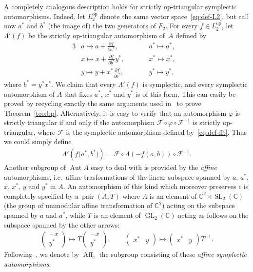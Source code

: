 \documentclass[11pt]{article}
\newcommand{\bb}[1]{\mathbb{#1}}
\DeclareMathOperator{\GL}{GL}
\DeclareMathOperator{\SL}{SL}
\DeclareMathOperator{\Aut}{Aut}
\DeclareMathOperator{\Aff}{Aff}
\begin{document}
A completely analogous description holds for strictly op-triangular symplectic automorphisms.
Indeed, let \(L_{2}^{\mathrm{op}}\) denote the same vector space~\eqref{eq:def-L2}, but call now \(a^{*}\)
and \(b^{*}\) (the image of) the two generators of \(F_{2}\).
For every \(f\in L_{2}^{\mathrm{op}}\), let \(\Lambda'(f)\) be the strictly op-triangular automorphism of~\(A\) def\/ined by
\begin{alignat*}{3}
& a\mapsto a+\frac{\partial f}{\partial a^{*}}, \qquad && a^{*}\mapsto a^{*}, & \\
& x\mapsto x+\frac{\partial f}{\partial b^{*}}y^{*}, \qquad && x^{*}\mapsto x^{*}, & \\
& y\mapsto y+x^{*}\frac{\partial f}{\partial b^{*}}, \qquad && y^{*}\mapsto y^{*}, &
\end{alignat*}
where \(b^{*} = y^{*}x^{*}\).
We claim that every \(\Lambda'(f)\) is symplectic, and every symplectic automorphism of \(A\) that f\/ixes
\(a^{*}\), \(x^{*}\) and \(y^{*}\) is of this form.
This can easily be proved by recycling exactly the same arguments used in~\cite{bp08} to prove
Theorem~\ref{teo:bp}.
Alternatively, it is easy to verify that an automorphism \(\varphi\) is strictly triangular if and only if
the automorphism \(\mathcal{F}\circ \varphi\circ \mathcal{F}^{-1}\) is strictly op-triangular, where
\(\mathcal{F}\) is the symplectic automorphism def\/ined by~\eqref{eq:def-fft}.
Thus we could simply def\/ine
\begin{gather}
\label{eq:t-opt}
\Lambda'(f\big(a^{*},b^{*}\big))=\mathcal{F}\circ\Lambda(-f(a,b))\circ\mathcal{F}^{-1}.
\end{gather}
Another subgroup of \(\Aut A\) easy to deal with is provided by the \emph{affine} automorphisms, i.e.\
af\/f\/ine trasformations of the linear subspace spanned by \(a\), \(a^{*}\), \(x\), \(x^{*}\), \(y\) and
\(y^{*}\) in \(A\).
An automorphism of this kind which moreover preserves \(c\) is completely specif\/ied by a~pair \((A,T)\)
where \(A\) is an element of \(\bb{C}^{2}\rtimes \SL_{2}(\bb{C})\) (the group of unimodular af\/f\/ine
transformation of \(\bb{C}^{2}\)) acting on the subspace spanned by \(a\) and \(a^{*}\), while \(T\) is an
element of \(\GL_{2}(\bb{C})\) acting as follows on the subspace spanned by the other arrows:
\begin{gather*}%
\begin{pmatrix}
-x
\\
y^{*}
\end{pmatrix}
\mapsto T
\begin{pmatrix}
-x
\\
y^{*}
\end{pmatrix},
\qquad
\begin{pmatrix}
x^{*}&y
\end{pmatrix}
\mapsto
\begin{pmatrix}
x^{*}&y
\end{pmatrix}
T^{-1}.
\end{gather*}
Following~\cite{bp08}, we denote by \(\Aff_{c}\) the subgroup consisting of these \emph{affine symplectic
automorphisms}.
\end{document}
